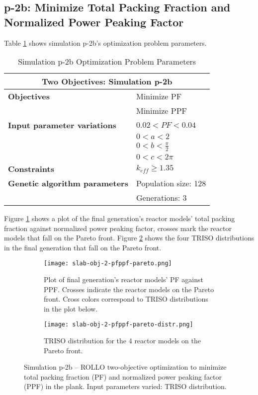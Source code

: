 \subsection{p-2b: Minimize Total Packing Fraction and Normalized Power Peaking Factor}
Table \ref{tab:simulationp2b} shows simulation p-2b's optimization problem parameters. 
\begin{table}[htbp]
    \centering
    \onehalfspacing
    \caption{Simulation p-2b Optimization Problem Parameters}
	\label{tab:simulationp2b}
    \footnotesize
    \begin{tabular}{l|p{3cm}}
    \hline 
    \multicolumn{2}{c}{\textbf{Two Objectives: Simulation p-2b}} \\
    \hline 
    \textbf{Objectives} & Minimize PF \\
    & Minimize PPF \\
    \hline 
    \textbf{Input parameter variations} & $0.02<PF<0.04$ \\
    & $0<a<2$ \\
    & $0<b<\frac{\pi}{2}$ \\
    & $0<c<2\pi$ \\
    \hline
    \textbf{Constraints} & $k_{eff} \geq 1.35$\\ 
    \hline 
    \textbf{Genetic algorithm parameters} & Population size: 128 \\
    & Generations: 3 \\
    \hline
    \end{tabular}
\end{table}
Figure \ref{fig:slab-obj-2-pfppf-pareto} shows a plot of the final generation's reactor models' 
total packing fraction against normalized power peaking factor, crosses mark the reactor 
models that fall on the Pareto front.
Figure \ref{fig:slab-obj-2-pfppf-pareto-distr} shows the four TRISO distributions in 
the final generation that fall on the Pareto front. 
\begin{figure}[htbp]
    \centering
    \begin{subfigure}{\textwidth}
        \texttt{[image: slab-obj-2-pfppf-pareto.png]}
        \caption{Plot of final generation's reactor models' PF against PPF. 
        Crosses indicate the reactor models on the Pareto front. Cross colors correspond  
        to TRISO distributions in the plot below.}
        \label{fig:slab-obj-2-pfppf-pareto} 
    \end{subfigure}
    \begin{subfigure}{\textwidth}
        \texttt{[image: slab-obj-2-pfppf-pareto-distr.png]}
        \caption{TRISO distribution for the 4 reactor models on the Pareto front.}
        \label{fig:slab-obj-2-pfppf-pareto-distr} 
    \end{subfigure}
    \caption{Simulation p-2b -- ROLLO two-objective optimization to minimize total packing fraction (PF) and  
    normalized power peaking factor (PPF) in the plank. Input parameters varied: 
    TRISO distribution.}
    \label{fig:slab-obj-2-pfppf}
\end{figure}
